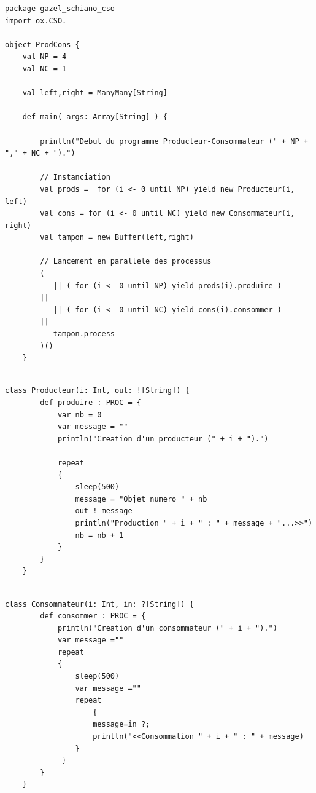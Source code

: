 \documentclass[a4paper,11pt,french]{report}
\begin{document}
\begin{lstlisting}[frame=trBL,title={Producteurs-Consommateurs avec un buffer : En-tête}]
package gazel_schiano_cso
import ox.CSO._

object ProdCons {
    val NP = 4
    val NC = 1
    
    val left,right = ManyMany[String]

    def main( args: Array[String] ) {
        
        println("Debut du programme Producteur-Consommateur (" + NP + "," + NC + ").")
        
        // Instanciation
        val prods =  for (i <- 0 until NP) yield new Producteur(i, left)
        val cons = for (i <- 0 until NC) yield new Consommateur(i, right)
        val tampon = new Buffer(left,right)
        
        // Lancement en parallele des processus
        ( 
           || ( for (i <- 0 until NP) yield prods(i).produire )
        || 
           || ( for (i <- 0 until NC) yield cons(i).consommer )
        || 
           tampon.process 
        )()
    }
    
\end{lstlisting}

\begin{lstlisting}[frame=trBL,title={Producteurs-Consommateurs : Producteur}, firstnumber=last]
    class Producteur(i: Int, out: ![String]) {
        def produire : PROC = {
            var nb = 0
            var message = ""
            println("Creation d'un producteur (" + i + ").")
            
            repeat 
            {
                sleep(500)
                message = "Objet numero " + nb
                out ! message
                println("Production " + i + " : " + message + "...>>")
                nb = nb + 1
            }
        }
    }
    
\end{lstlisting}

\begin{lstlisting}[frame=trBL,title={Producteurs-Consommateurs: Consommateur}, firstnumber=last]
    class Consommateur(i: Int, in: ?[String]) {
        def consommer : PROC = {
            println("Creation d'un consommateur (" + i + ").")
            var message =""
            repeat
            {
                sleep(500)
                var message =""
                repeat 
                    {
                    message=in ?; 
                    println("<<Consommation " + i + " : " + message)
                }
             }
        }
    } 
     
\end{lstlisting}
\end{document}
